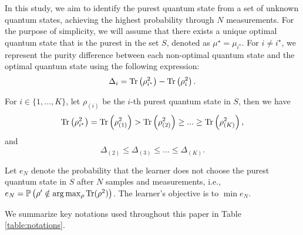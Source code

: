 In this study, we aim to identify the purest quantum state from a set of unknown quantum states, achieving the highest probability through $ N $ measurements. For the purpose of simplicity, we will assume that there exists a unique optimal quantum state that is the purest in the set $ S $, denoted as $ \mu^\star = \mu_{i^\star} $. For $ i \neq i^\star $, we represent the purity difference between each non-optimal quantum state and the optimal quantum state using the following expression:
\begin{equation*}
    \Delta_i = \mathrm{Tr}\left(\rho_{i^\star}^{2}\right) - \mathrm{Tr}\left(\rho_{i}^{2}\right).
\end{equation*}

For $i \in \{1,...,K\}$, let $\rho_{(i)}$ be the $i$-th purest quantum state in $S$, then we have
\begin{equation*}
    \mathrm{Tr}\left(\rho_{i^\star}^{2}\right) = \mathrm{Tr}\left(\rho_{(1)}^{2}\right) > \mathrm{Tr}\left(\rho_{(2)}^{2}\right) \geq...\geq \mathrm{Tr}\left(\rho_{(K)}^{2}\right),
\end{equation*}
and
\begin{equation*}
    \Delta_{(2)} \leq \Delta_{(3)} \leq ... \leq \Delta_{(K)}.
\end{equation*}

Let $e_N$ denote the probability that the learner does not choose the purest quantum state in $S$ after $N$ samples and measurements, i.e., $e_N = \mathbb{P}\left(\rho' \notin \arg\max_\rho \mathrm{Tr}(\rho^2)\right)$. The learner's objective is to $\min e_N$.

We summarize key notations used throughout this paper in Table \ref{table:notations}.